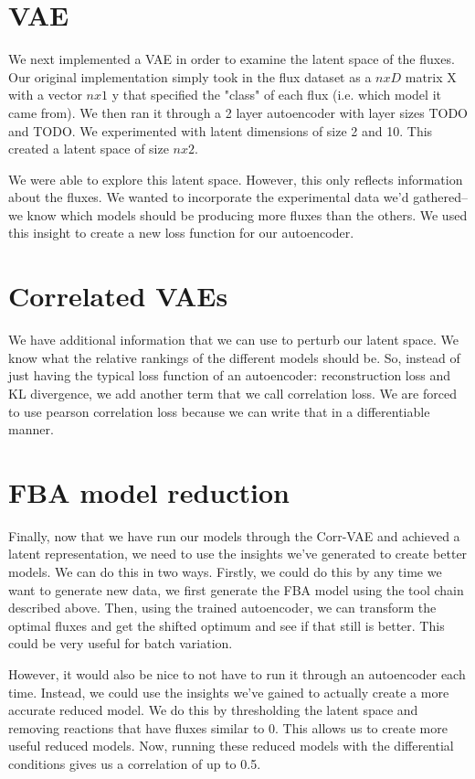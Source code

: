 \section{VAE}
We next implemented a VAE in order to examine the latent space of the fluxes.
Our original implementation simply took in the flux dataset as a $n x D$ matrix X with a vector $n x 1$ y that specified the "class" of each flux (i.e. which model it came from).
We then ran it through a 2 layer autoencoder with layer sizes TODO and TODO.
We experimented with latent dimensions of size 2 and 10.
This created a latent space of size $n x 2$.

We were able to explore this latent space.
However, this only reflects information about the fluxes.
We wanted to incorporate the experimental data we'd gathered--we know which models should be producing more fluxes than the others.
We used this insight to create a new loss function for our autoencoder.

\section{Correlated VAEs}
We have additional information that we can use to perturb our latent space.
We know what the relative rankings of the different models should be.
So, instead of just having the typical loss function of an autoencoder: reconstruction loss and KL divergence, we add another term that we call correlation loss.
We are forced to use pearson correlation loss because we can write that in a differentiable manner.

\section{FBA model reduction}
Finally, now that we have run our models through the Corr-VAE and achieved a latent representation, we need to use the insights we've generated to create better models.
We can do this in two ways.
Firstly, we could do this by any time we want to generate new data, we first generate the FBA model using the tool chain described above.
Then, using the trained autoencoder, we can transform the optimal fluxes and get the shifted optimum and see if that still is better.
This could be very useful for batch variation.

However, it would also be nice to not have to run it through an autoencoder each time.
Instead, we could use the insights we've gained to actually create a more accurate reduced model.
We do this by thresholding the latent space and removing reactions that have fluxes similar to 0.
This allows us to create more useful reduced models.
Now, running these reduced models with the differential conditions gives us a correlation of up to 0.5.

\cite{ebrahim2013cobrapy}